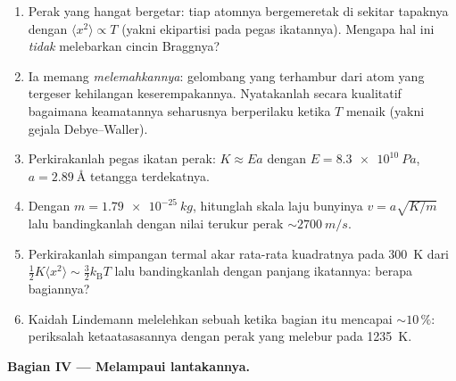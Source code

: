 \begin{problem}
\begin{enumerate}[resume]
  \item Perak yang hangat bergetar: tiap atomnya bergemeretak di sekitar
        tapaknya dengan $\langle x^2\rangle \propto T$ (yakni ekipartisi
        pada pegas ikatannya). Mengapa hal ini \emph{tidak} melebarkan
        cincin Braggnya?
  \item Ia memang \emph{melemahkannya}: gelombang yang terhambur dari atom
        yang tergeser kehilangan keserempakannya. Nyatakanlah secara
        kualitatif bagaimana keamatannya seharusnya berperilaku ketika $T$
        menaik (yakni gejala Debye--Waller).
  \item Perkirakanlah pegas ikatan perak: $K \approx Ea$ dengan
        $E = \qty{8.3e10}{Pa}$, $a = \qty{2.89}{\angstrom}$
        tetangga terdekatnya.
  \item Dengan $m = \qty{1.79e-25}{kg}$, hitunglah skala laju bunyinya
        $v = a\sqrt{K/m}$ lalu bandingkanlah dengan nilai terukur perak
        $\sim\qty{2700}{m/s}$.
  \item Perkirakanlah simpangan termal akar rata-rata kuadratnya pada \qty{300}{K}
        dari $\tfrac12K\langle x^2\rangle \sim
        \tfrac32k_{\text{B}}T$ lalu bandingkanlah dengan panjang
        ikatannya: berapa bagiannya?
  \item Kaidah Lindemann melelehkan sebuah  ketika bagian itu
        mencapai $\sim10\,\%$: periksalah ketaatasasannya dengan perak
        yang melebur pada \qty{1235}{K}.
\end{enumerate}

\medskip\noindent\textbf{Bagian IV --- Melampaui lantakannya.}


\end{problem}
